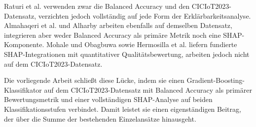 Raturi et al. \cite{raturi2026exploratory} verwenden zwar die Balanced Accuracy und den CICIoT2023-Datensatz, verzichten jedoch vollständig auf jede Form der Erklärbarkeitsanalyse. Almahaqeri et al. \cite{almahaqeri2026gradient} und Alharby \cite{alharby2025ciciot} arbeiten ebenfalls auf demselben Datensatz, integrieren aber weder Balanced Accuracy als primäre Metrik noch eine SHAP-Komponente. Mohale und Obagbuwa \cite{mohale2025xai} sowie Hermosilla et al. \cite{hermosilla2025xai_forensic} liefern fundierte SHAP-Integrationen mit quantitativer Qualitätsbewertung, arbeiten jedoch nicht auf dem CICIoT2023-Datensatz.

Die vorliegende Arbeit schließt diese Lücke, indem sie einen Gradient-Boosting-Klassifikator auf dem CICIoT2023-Datensatz mit Balanced Accuracy als primärer Bewertungsmetrik und einer vollständigen SHAP-Analyse auf beiden Klassifikationsstufen verbindet. Damit leistet sie einen eigenständigen Beitrag, der über die Summe der bestehenden Einzelansätze hinausgeht.
